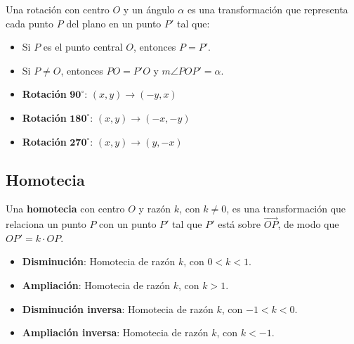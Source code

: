 Una rotación con centro $O$ y un ángulo $\alpha$ es una transformación que representa cada punto $P$ del plano en un punto $P'$ tal que:

\begin{itemize}
    \item Si $P$ es el punto central $O$, entonces $P = P'$.
    \item Si $P \neq O$, entonces $PO = P'O$ y $m\angle{POP'} = \alpha$.
\end{itemize}

\begin{itemize}
    \item \textbf{Rotación} $\mathbf{90^{\circ}}$: $(x,y) \to (-y,x)$
    \item \textbf{Rotación} $\mathbf{180^{\circ}}$: $(x,y) \to (-x,-y)$
    \item \textbf{Rotación} $\mathbf{270^{\circ}}$: $(x,y) \to (y,-x)$
\end{itemize}


\subsection{Homotecia}

Una \textbf{homotecia} con centro $O$ y razón $k$, con $k \neq 0$, es una transformación que relaciona un punto $P$ con un punto $P'$ tal que $P'$ está sobre $\overrightarrow{OP}$, de modo que $OP' = k \cdot OP$.

\begin{itemize}
    \item \textbf{Disminución}: Homotecia de razón $k$, con $0 < k < 1$.
    \item \textbf{Ampliación}: Homotecia de razón $k$, con $k > 1$.
    \item \textbf{Disminución inversa}: Homotecia de razón $k$, con $-1 < k < 0$.
    \item \textbf{Ampliación inversa}: Homotecia de razón $k$, con $k < -1$.
\end{itemize}
